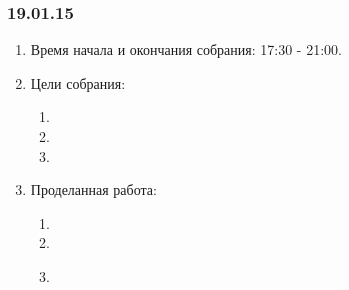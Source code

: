\subsubsection{19.01.15}
\begin{enumerate}
	
	\item Время начала и окончания собрания: 17:30 - 21:00.
	
	\item Цели собрания: 
	\begin{enumerate}
		
		\item 
		
		\item 
		
        \item 
		
	\end{enumerate}

	\item Проделанная работа:
	\begin{enumerate}
		
		\item 
		
		\item 
		
        \item 
		
        \begin{figure}[H]
	  	  \begin{minipage}[h]{0.2\linewidth}
	  	    \center  
	  	  \end{minipage}
	  	  \begin{minipage}[h]{0.6\linewidth}
	  		\caption{}
	  	  \end{minipage}
	   \end{figure}


\end{enumerate}
\end{enumerate}
